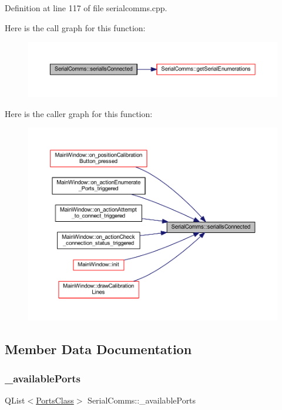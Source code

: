 Definition at line 117 of file serialcomms.\+cpp.

Here is the call graph for this function\+:
\nopagebreak
\begin{figure}[H]
\begin{center}
\leavevmode
\includegraphics[width=350pt]{classSerialComms_ad9980837a7d0672d100b0b83e3e47451_cgraph}
\end{center}
\end{figure}
Here is the caller graph for this function\+:
\nopagebreak
\begin{figure}[H]
\begin{center}
\leavevmode
\includegraphics[width=350pt]{classSerialComms_ad9980837a7d0672d100b0b83e3e47451_icgraph}
\end{center}
\end{figure}


\subsection{Member Data Documentation}
\mbox{\label{classSerialComms_aed2175e6fe3d3c62e8f0b12333c7b650}} 
\subsubsection{\texorpdfstring{\_availablePorts}{\_availablePorts}}
{\footnotesize\ttfamily Q\+List$<$\mbox{\hyperlink{classPortsClass}{Ports\+Class}}$>$ Serial\+Comms\+::\+\_\+available\+Ports\hspace{0.3cm}{\ttfamily [private]}}




